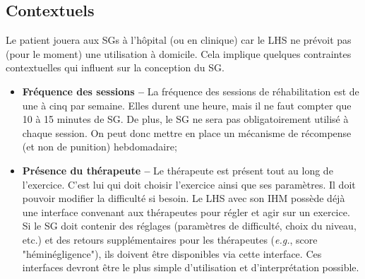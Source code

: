 		\subsection*{Contextuels}
			Le patient jouera aux SGs à l'hôpital (ou en clinique) car le LHS ne prévoit pas (pour le moment) une utilisation à domicile. Cela implique quelques contraintes contextuelles qui influent sur la conception du SG.
			\begin{itemize}
				\item \textbf{Fréquence des sessions --} La fréquence des sessions de réhabilitation est de une à cinq par semaine. Elles durent une heure, mais il ne faut compter que 10 à 15 minutes de SG. De plus, le SG ne sera pas obligatoirement utilisé à chaque session. On peut donc mettre en place un mécanisme de récompense (et non de punition) hebdomadaire;
				\item \textbf{Présence du thérapeute --} Le thérapeute est présent tout au long de l'exercice. C'est lui qui doit choisir l'exercice ainsi que ses paramètres. Il doit pouvoir modifier la difficulté si besoin. Le LHS avec son IHM possède déjà une interface convenant aux thérapeutes pour régler et agir sur un exercice. Si le SG doit contenir des réglages (paramètres de difficulté, choix du niveau, etc.) et des retours supplémentaires pour les thérapeutes (\textit{e.g.}, score "héminégligence"), ils doivent être disponibles via cette interface. Ces interfaces devront être le plus simple d'utilisation et d'interprétation possible.
			\end{itemize}		
	
